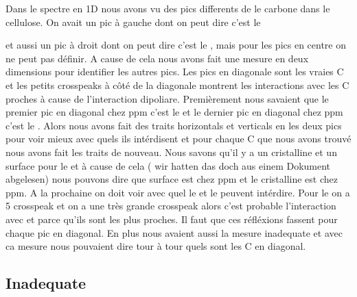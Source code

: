 \documentclass[a4paper,12pt]{scrartcl}
\begin{document}
Dans le spectre  en 1D nous avons vu des pics differents de le carbone dans le cellulose. On avait un pic à gauche dont on peut dire c’est le { et aussi un pic à droit dont on peut dire c’est le {, mais pour les pics en centre on ne peut pas définir. A cause de cela nous avons fait une mesure en deux dimensions pour identifier les autres pics. Les pics en diagonale sont les vraies C et les petits crosspeaks à côté de la diagonale montrent les interactions avec les C proches à cause de l’interaction dipoliare. Premièrement nous savaient que le premier pic en diagonal chez \unit [105] {ppm} c’est le } et le dernier pic en diagonal chez \unit[62,5] {ppm} c’est le . Alors nous avons fait des traits horizontals et verticals en les deux pics pour voir mieux avec quels ils intérdisent et pour chaque C que nous avons trouvé nous avons fait les traits de nouveau. Nous savons qu’il y a un  cristalline et un  surface pour le  et à cause de cela ( wir hatten das doch aus einem Dokument abgelesen) nous pouvons dire que  surface est chez \unit [22,5] {ppm} et le  cristalline est chez \unit [65] {ppm}. A la prochaine on doit voir avec quel le  et le  peuvent intérdire. Pour le  on a 5 crosspeak et on a une très grande crosspeak alors c’est probable l’interaction avec  et  parce qu’ils sont les plus proches. Il faut que ces réfléxions fassent pour chaque pic en diagonal. En plus nous avaient aussi la mesure inadequate et avec ca mesure nous pouvaient dire tour à  tour quels sont les C en diagonal.  
  
  \subsection{Inadequate}

}
\end{document}
